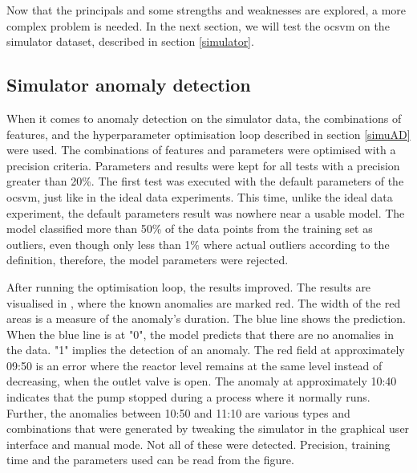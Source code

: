 \documentclass[english, a4paper]{report}
\begin{document}
{{{            Now that the principals and some strengths and weaknesses are explored, a more complex problem is needed. In the next section, we will test the \gls{ocsvm} on the simulator dataset, described in section \ref{simulator}.
        
        }
        
        \subsection{Simulator anomaly detection}
        {
            When it comes to anomaly detection on the simulator data, the combinations of features, and the hyperparameter optimisation loop described in section \ref{simuAD} were used. The combinations of features and parameters were optimised with a precision criteria. Parameters and results were kept for all tests with a precision greater than 20\%. The first test was executed with the default parameters of the \gls{ocsvm}, just like in the ideal data experiments. This time, unlike the ideal data experiment, the default parameters result was nowhere near a usable model. The model classified more than 50\% of the data points from the training set as outliers, even though only less than 1\% where actual outliers according to the definition, therefore, the model parameters were rejected. 
            \par
            After running the optimisation loop, the results improved. The results are visualised in , where the known anomalies are marked red. The width of the red areas is a measure of the anomaly's duration. The blue line shows the prediction. When the blue line is at "0", the model predicts that there are no anomalies in the data. "1" implies the detection of an anomaly. The red field at approximately 09:50 is an error where the reactor level remains at the same level instead of decreasing, when the outlet valve is open. The anomaly at approximately 10:40 indicates that the pump stopped during a process where it normally runs. Further, the anomalies between 10:50 and 11:10 are various types and combinations that were generated by tweaking the simulator in the graphical user interface and manual mode. Not all of these were detected. Precision, training time and the parameters used can be read from the figure.
            
}}}
\end{document}
